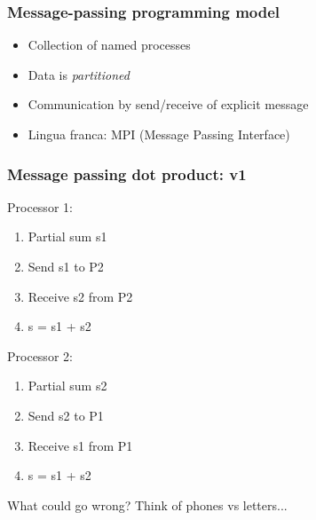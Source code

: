 \documentclass{beamer}
\begin{document}
\begin{frame}
  \frametitle{Message-passing programming model}

  \begin{center}
    
  \end{center}
  \begin{itemize}
  \item Collection of named processes
  \item Data is {\em partitioned}
  \item Communication by send/receive of explicit message
  \item Lingua franca: MPI (Message Passing Interface)
  \end{itemize}
\end{frame}


\begin{frame}
  \frametitle{Message passing dot product: v1}

  \begin{minipage}{0.45\textwidth}
    Processor 1:
    \begin{enumerate}
    \item Partial sum s1
    \item Send s1 to P2
    \item Receive s2 from P2
    \item s = s1 + s2
    \end{enumerate}
  \end{minipage}
  \begin{minipage}{0.45\textwidth}
    Processor 2:
    \begin{enumerate}
    \item Partial sum s2
    \item Send s2 to P1
    \item Receive s1 from P1
    \item s = s1 + s2
    \end{enumerate}
  \end{minipage}

  \vspace{1cm}
  What could go wrong?  Think of phones vs letters...

\end{frame}
\end{document}
